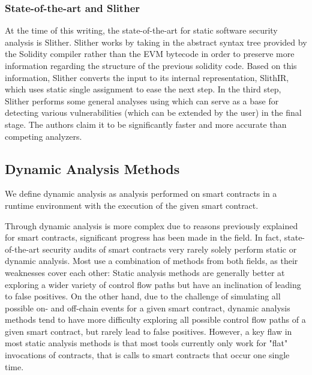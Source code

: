 \documentclass[letterpaper,twocolumn,10pt]{article}
\begin{document}
\subsubsection{State-of-the-art and Slither}
At the time of this writing, the state-of-the-art for static software security analysis is Slither. Slither works by taking in the abstract syntax tree provided by the Solidity compiler rather than the EVM bytecode in order to preserve more information regarding the structure of the previous solidity code. Based on this information, Slither converts the input to its internal representation, SlithIR, which uses static single assignment to ease the next step. In the third step, Slither performs some general analyses using which can serve as a base for detecting various vulnerabilities (which can be extended by the user) in the final stage. The authors claim it to be significantly faster and more accurate than competing analyzers.

\subsection{Dynamic Analysis Methods}

We define dynamic analysis as analysis performed on smart contracts in a runtime environment with the execution of the given smart contract.


Through dynamic analysis is more complex due to reasons previously explained for smart contracts, significant progress has been made in the field. In fact, state-of-the-art security audits of smart contracts very rarely solely perform static or dynamic analysis. Most use a combination of methods from both fields, as their weaknesses cover each other: Static analysis methods are generally better at exploring a wider variety of control flow paths but have an inclination of leading to false positives. On the other hand, due to the challenge of simulating all possible on- and off-chain events for a given smart contract, dynamic analysis methods tend to have more difficulty exploring all possible control flow paths of a given smart contract, but rarely lead to false positives. However, a key flaw in most static analysis methods is that most tools currently only work for "flat" invocations of contracts, that is calls to smart contracts that occur one single time.
\end{document}
